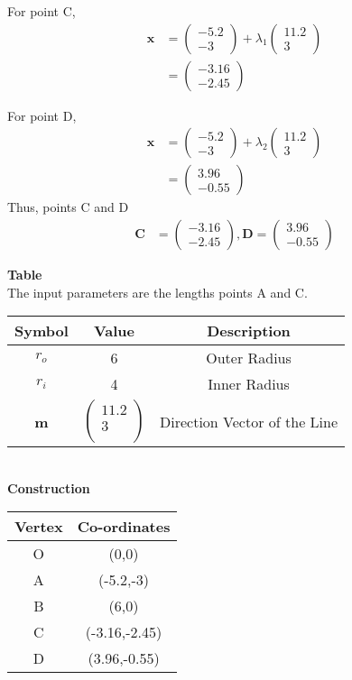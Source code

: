 \documentclass[10pt,a4paper]{report}
\newcommand{\myvec}[1]{\ensuremath{\begin{pmatrix}#1\end{pmatrix}}}
\let\vec\mathbf
\begin{document}
\begin{multicols}{2}
For point C,
\begin{align}
\vec{x} &= \myvec{-5.2 \\ -3} +  \lambda_1 \myvec{11.2 \\ 3}
\\
&= \myvec{-3.16 \\ -2.45}
\end{align}

For point D,
\begin{align}
\vec{x} &= \myvec{-5.2 \\ -3} +  \lambda_2 \myvec{11.2 \\ 3}
\\
&= \myvec{3.96 \\ -0.55}
\end{align}
Thus, points C and D
\begin{align}
\vec{C} &= \myvec{-3.16 \\ -2.45}, \vec{D} = \myvec{3.96 \\ -0.55} 
\end{align}

\textbf{Table} \vspace{2mm} \\

The input parameters are the lengths points A and C. \vspace{2mm} \\
{
\setlength\extrarowheight{2pt}
\begin{tabular}{|c|c|c|}
	\hline
	\textbf{Symbol}&\textbf{Value}&\textbf{Description}\\
	\hline
	$r_o$ & 6 &Outer Radius\\
	\hline
	$r_i$ & 4 & Inner Radius\\
	\hline
	\textbf{m} &$
	\begin{pmatrix}
		11.2\\
		3\\
	\end{pmatrix}$
	& Direction Vector of the Line\\
	\hline
\end{tabular}
}\vspace{6mm} \\
\textbf{Construction} \vspace{3mm} \\
{
\setlength\extrarowheight{2pt}
\begin{tabular}{|c|c|}
	\hline
	\textbf{Vertex}&\textbf{Co-ordinates}\\
	\hline
	O & (0,0)\\
	\hline
	A & (-5.2,-3)\\
	\hline
	B & (6,0)\\
	\hline
	C & (-3.16,-2.45)\\
	\hline
	D & (3.96,-0.55)\\
	\hline
\end{tabular}
}

  \end{multicols}
\end{document}
